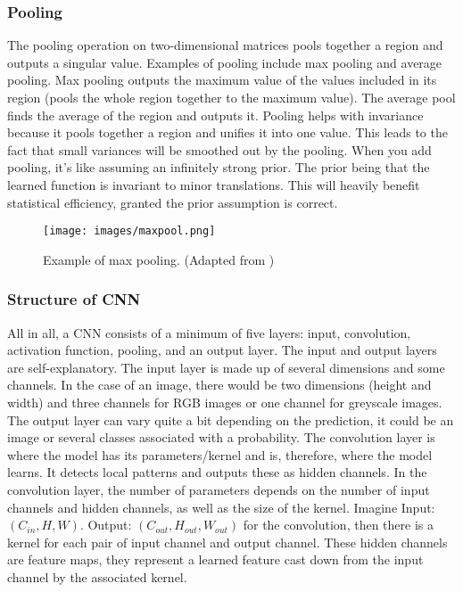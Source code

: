 \documentclass[a4paper,12pt]{article}
\begin{document}
\subsubsection{Pooling}
The pooling operation on two-dimensional matrices pools together a region and outputs a singular value. Examples of pooling include max pooling and average pooling. Max pooling outputs the maximum value of the values included in its region (pools the whole region together to the maximum value). The average pool finds the average of the region and outputs it.
Pooling helps with invariance because it pools together a region and unifies it into one value. This leads to the fact that small variances will be smoothed out by the pooling.
When you add pooling, it's like assuming an infinitely strong prior. The prior being that the learned function is invariant to minor translations. This will heavily benefit statistical efficiency, granted the prior assumption is correct.
\begin{figure}[H]
\centering
\texttt{[image: images/maxpool.png]}
\caption{Example of max pooling. (Adapted from \cite{maxpool_cs_wiki})} %
\label{fig:n7}
\end{figure}
\subsubsection{Structure of CNN}
All in all, a CNN consists of a minimum of five layers: input, convolution, activation function, pooling, and an output layer.
The input and output layers are self-explanatory. The input layer is made up of several dimensions and some channels. In the case of an image, there would be two dimensions (height and width) and three channels for RGB images or one channel for greyscale images. The output layer can vary quite a bit depending on the prediction, it could be an image or several classes associated with a probability.
The convolution layer is where the model has its parameters/kernel and is, therefore, where the model learns. It detects local patterns and outputs these as hidden channels. In the convolution layer, the number of parameters depends on the number of input channels and hidden channels, as well as the size of the kernel. Imagine Input: $(C_{in}, H, W)$. Output: $(C_{out}, H_{out}, W_{out})$ for the convolution, then there is a kernel for each pair of input channel and output channel. These hidden channels are feature maps, they represent a learned feature cast down from the input channel by the associated kernel.
\end{document}
